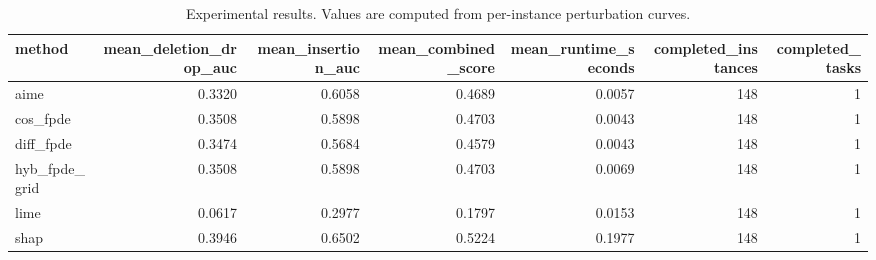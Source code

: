 \begin{table}[t]
\caption{Experimental results. Values are computed from per-instance perturbation curves.}
\label{tab:main_results_computed}
\centering
\begin{tabular}{lrrrrrr}
\toprule
method & mean\_deletion\_drop\_auc & mean\_insertion\_auc & mean\_combined\_score & mean\_runtime\_seconds & completed\_instances & completed\_tasks \\
\midrule
aime & 0.3320 & 0.6058 & 0.4689 & 0.0057 & 148 & 1 \\
cos\_fpde & 0.3508 & 0.5898 & 0.4703 & 0.0043 & 148 & 1 \\
diff\_fpde & 0.3474 & 0.5684 & 0.4579 & 0.0043 & 148 & 1 \\
hyb\_fpde\_grid & 0.3508 & 0.5898 & 0.4703 & 0.0069 & 148 & 1 \\
lime & 0.0617 & 0.2977 & 0.1797 & 0.0153 & 148 & 1 \\
shap & 0.3946 & 0.6502 & 0.5224 & 0.1977 & 148 & 1 \\
\bottomrule
\end{tabular}

\end{table}
